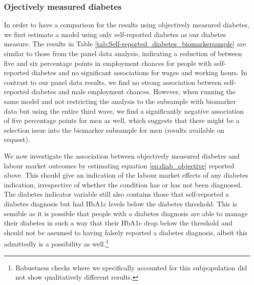 \subsubsection*{Ojectively measured diabetes}

In order to have a comparison for the results using objectively measured
diabetes, we first estimate a model using only self-reported diabetes as our diabetes measure.
The results in Table \ref{tab:Self-reported_diabetes_biomarkersample}
are similar to those from the panel data analysis, indicating a reduction
of between five and six percentage points in employment chances for
people with self-reported diabetes and no significant associations
for wages and working hours. In contrast to our panel data results,
we find no strong association between self-reported diabetes and male
employment chances. However, when running the same model and not restricting the analysis to the subsample with biomarker data but using the
entire third wave, we find a significantly negative association of
five percentage points for men as well, which suggests that there
might be a selection issue into the biomarker subsample for men (results available on request).

We now investigate the association between objectively measured
diabetes and labour market outcomes by estimating equation \ref{eq:diab_objective}
reported above. This should give an indication of the labour
market effects of any diabetes indication, irrespective of whether
the condition has or has not been diagnosed. The diabetes indicator
variable still also contains those that self-reported a diabetes diagnosis
but had \ac{HbA1c} levels below the diabetes threshold. This is sensible as it is possible that people with a diabetes diagnosis are able to manage their diabetes in such a way that their \ac{HbA1c} drop below the threshold and should not be assumed to having falsely reported a diabetes diagnosis, albeit this admittedly is a possibility as well.\footnote{Robustness checks where we specifically accounted for this subpopulation
did not show qualitatively different results.} 

